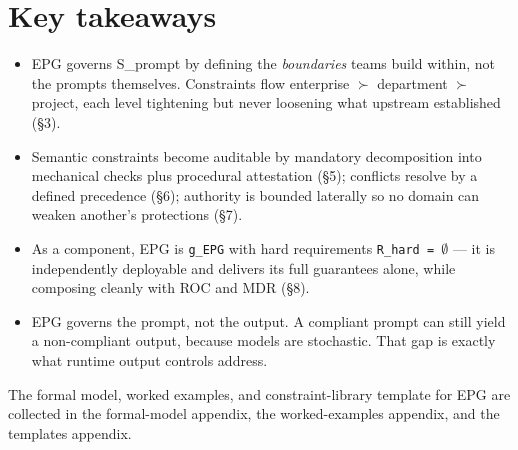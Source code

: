 \section{Key takeaways}


\begin{itemize}
  \item EPG governs S\_\allowbreak{}prompt by defining the \emph{boundaries} teams build within, not the prompts themselves. Constraints flow enterprise $\succ$ department $\succ$ project, each level tightening but never loosening what upstream established (\S{}3).
  \item Semantic constraints become auditable by mandatory decomposition into mechanical checks plus procedural attestation (\S{}5); conflicts resolve by a defined precedence (\S{}6); authority is bounded laterally so no domain can weaken another's protections (\S{}7).
  \item As a component, EPG is \texttt{g\_\allowbreak{}EPG} with hard requirements \texttt{R\_\allowbreak{}hard = $\emptyset$} --- it is independently deployable and delivers its full guarantees alone, while composing cleanly with ROC and MDR (\S{}8).
  \item EPG governs the prompt, not the output. A compliant prompt can still yield a non-compliant output, because models are stochastic. That gap is exactly what runtime output controls address.
\end{itemize}


The formal model, worked examples, and constraint-library template for EPG are collected in the formal-model appendix, the worked-examples appendix, and the templates appendix.

